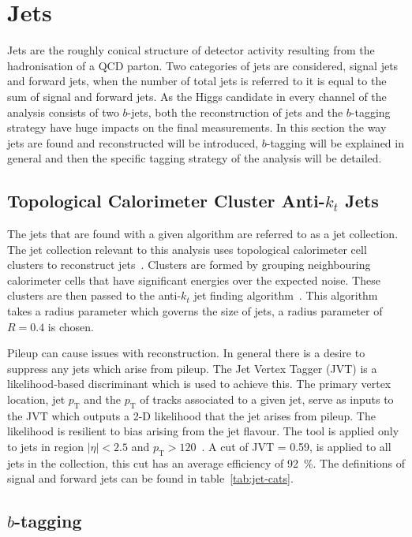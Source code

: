 \section{Jets}
\label{sec:jets}

Jets are the roughly conical structure of detector activity resulting from the
hadronisation of a QCD parton. Two categories of jets are considered, signal
jets and forward jets, when the number of total jets is referred to it is equal
to the sum of signal and forward jets. As the Higgs candidate in every channel
of the analysis consists of two $b$-jets, both the reconstruction of jets and
the $b$-tagging strategy have huge impacts on the final measurements. In this
section the way jets are found and reconstructed will be introduced, $b$-tagging
will be explained in general and then the specific tagging strategy of the
analysis will be detailed.

\subsection{Topological Calorimeter Cluster Anti-$k_t$ Jets}
The jets that are found with a given algorithm are referred to as a jet
collection. The jet collection relevant to this analysis uses topological
calorimeter cell clusters to reconstruct jets~\cite{CALO2008}. Clusters are
formed by grouping neighbouring calorimeter cells that have significant energies
over the expected noise. These clusters are then passed to the anti-$k_t$ jet
finding algorithm~\cite{anti-kt}. This algorithm takes a radius parameter which
governs the size of jets, a radius parameter of $R=0.4$ is chosen.

Pileup can cause issues with reconstruction. In general there is a desire to
suppress any jets which arise from pileup. The Jet Vertex Tagger (JVT) is a
likelihood-based discriminant which is used to achieve this. The primary vertex
location, jet $p_{\mathrm{T}}$ and the $p_{\mathrm{T}}$ of tracks associated to
a given jet, serve as inputs to the JVT which outputs a 2-D likelihood that the
jet arises from pileup. The likelihood is resilient to bias arising from the jet
flavour. The tool is applied only to jets in region $\lvert \eta \rvert < 2.5$
and $p_{\mathrm{T}} > 120$~\GeV. A cut of JVT = 0.59, is applied to all jets in
the collection, this cut has an average efficiency of 92~\%. The definitions of
signal and forward jets can be found in table~\ref{tab:jet-cats}.


\subsection{\texorpdfstring{$b$}{b}-tagging}
\label{sec:btagging}

